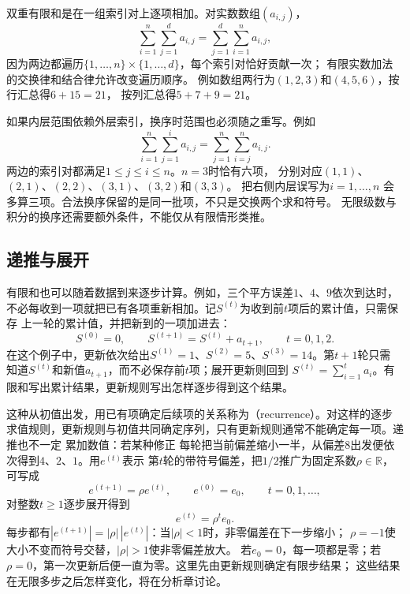 双重有限和是在一组索引对上逐项相加。对实数数组$(a_{i,j})$，
\[
  \sum_{i=1}^{n}\sum_{j=1}^{d}a_{i,j}
  =
  \sum_{j=1}^{d}\sum_{i=1}^{n}a_{i,j},
\]
因为两边都遍历$\{1,\ldots,n\}\times\{1,\ldots,d\}$，每个索引对恰好贡献一次；
有限实数加法的交换律和结合律允许改变遍历顺序。
例如数组两行为$(1,2,3)$和$(4,5,6)$，按行汇总得$6+15=21$，
按列汇总得$5+7+9=21$。

如果内层范围依赖外层索引，换序时范围也必须随之重写。例如
\begin{equation}
  \sum_{i=1}^{n}\sum_{j=1}^{i}a_{i,j}
  =
  \sum_{j=1}^{n}\sum_{i=j}^{n}a_{i,j}.
  \label{eq:prelim-triangular-sum}
\end{equation}
两边的索引对都满足$1\leq j\leq i\leq n$。$n=3$时恰有六项，
分别对应$(1,1)$、$(2,1)$、$(2,2)$、$(3,1)$、$(3,2)$和$(3,3)$。
把右侧内层误写为$i=1,\ldots,n$
会多算三项。合法换序保留的是同一批项，不只是交换两个求和符号。
无限级数与积分的换序还需要额外条件，不能仅从有限情形类推。

\subsection{递推与展开}
\label{sec:prelim-recurrence-unrolling}

有限和也可以随着数据到来逐步计算。例如，三个平方误差$1$、$4$、$9$依次到达时，
不必每收到一项就把已有各项重新相加。记$S^{(t)}$为收到前$t$项后的累计值，只需保存
上一轮的累计值，并把新到的一项加进去：
\[
  S^{(0)}=0,\qquad S^{(t+1)}=S^{(t)}+a_{t+1},\qquad t=0,1,2.
\]
在这个例子中，更新依次给出$S^{(1)}=1$、$S^{(2)}=5$、$S^{(3)}=14$。第$t+1$轮只需
知道$S^{(t)}$和新值$a_{t+1}$，而不必保存前$t$项；展开更新则回到
$S^{(t)}=\sum_{i=1}^{t}a_i$。有限和写出累计结果，更新规则写出怎样逐步得到这个结果。

这种从初值出发，用已有项确定后续项的关系称为（recurrence）。对这样的逐步
求值规则，更新规则与初值共同确定序列，只有更新规则通常不能确定每一项。递推也不一定
累加数值：若某种修正
每轮把当前偏差缩小一半，从偏差$8$出发便依次得到$4$、$2$、$1$。用$e^{(t)}$表示
第$t$轮的带符号偏差，把$1/2$推广为固定系数$\rho\in\mathbb{R}$，可写成
\begin{equation}
  e^{(t+1)}=\rho e^{(t)},\qquad e^{(0)}=e_0,\qquad t=0,1,\ldots,
  \label{eq:prelim-geometric-recurrence}
\end{equation}
对整数$t\geq1$逐步展开得到
\[
  e^{(t)}=\rho^t e_0.
\]
每步都有$|e^{(t+1)}|=|\rho|\,|e^{(t)}|$：当$|\rho|<1$时，非零偏差在下一步缩小；
$\rho=-1$使大小不变而符号交替，$|\rho|>1$使非零偏差放大。
若$e_0=0$，每一项都是零；若$\rho=0$，第一次更新后便一直为零。这里先由更新规则确定有限步结果；
这些结果在无限多步之后怎样变化，将在分析章讨论。

